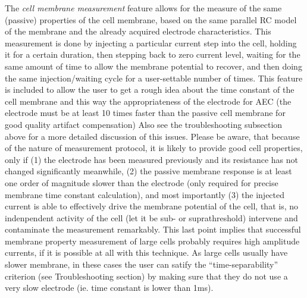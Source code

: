 \documentclass{article}
\begin{document}
The \emph{cell membrane measurement} feature allows for the measure of the
same (passive) properties of the cell membrane, based on the same parallel
RC model of the membrane and the already acquired electrode
characteristics. This measurement is done by injecting a particular current step
into the cell, holding it for a certain duration, then stepping back to
zero current level, waiting for the same amount of time to allow the membrane
potential to recover, and then doing the same injection/waiting cycle for a
user-settable number of times. This feature is included to allow the user
to get a rough idea about the time constant of the cell membrane and this
way the appropriateness of the electrode for AEC (the electrode must be at
least 10 times faster than the passive cell membrane for good quality
artifact compensation) Also see the troubleshooting subsection above for a
more detailed discussion of this issues. Please be aware, that because of
the nature of measurement protocol, it is likely to provide good cell properties,
only if (1) the electrode has been measured previously and its resistance
has not changed significantly meanwhile, (2) the passive membrane response
is at least one order of 
magnitude slower than the electrode (only required for precise membrane time
constant calculation), and most importantly (3) the injected current is
able to effectively drive the membrane potential of the cell, that is,
no indenpendent activity of the cell (let it be sub- or suprathreshold)
intervene and contaminate the measurement remarkably. This last point
implies that successful membrane property measurement of large cells
probably requires high amplitude currents, if it is possible at all with
this technique. As large cells usually have slower membrane, in these cases
the user can satify the ``time-separability'' criterion (see
Troubleshooting section) by making sure that they do not use a very slow
electrode (ie. time constant is lower than 1ms).  
\end{document}
